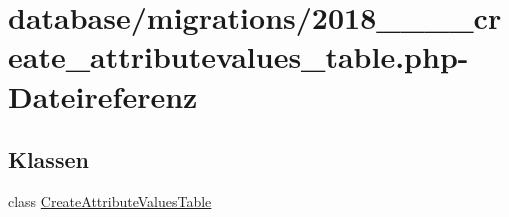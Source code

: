 \hypertarget{2018__06__15__144445__create__attributevalues__table_8php}{}\section{database/migrations/2018\+\_\+\_\+\_\+\_\+create\+\_\+attributevalues\+\_\+table.php-\/\+Dateireferenz}
\label{2018__06__15__144445__create__attributevalues__table_8php}
\subsection*{Klassen}
\begin{DoxyCompactItemize}
\item 
class \hyperlink{classCreateAttributeValuesTable}{Create\+Attribute\+Values\+Table}
\end{DoxyCompactItemize}
